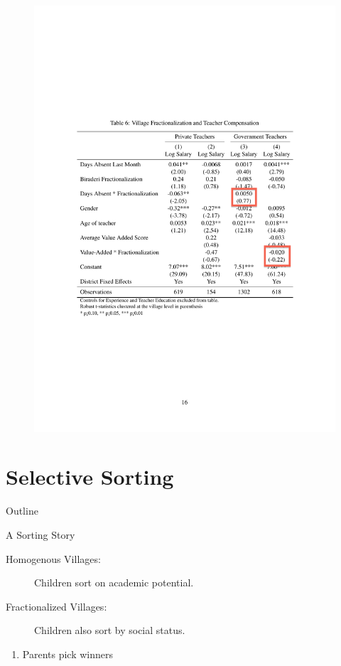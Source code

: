 \documentclass{beamer}
\begin{document}
\begin{frame}{}
\begin{figure}[htb]
	\begin{center}
	\includegraphics[scale=0.65]{tables/frac_and_compensation_box3.pdf}
	\end{center}
\end{figure}
\end{frame}


\section{Selective Sorting}\label{}
\begin{frame}{Outline}
	\tableofcontents[currentsection]
\end{frame}


\begin{frame}{A Sorting Story}
	\begin{description}
		\item [Homogenous Villages:] Children sort on academic potential.
		\item [Fractionalized Villages:] Children also sort by social status.
	\end{description}
	\pause
	\begin{enumerate}
		\item Parents pick winners
	\end{enumerate}
\end{frame}
\end{document}
